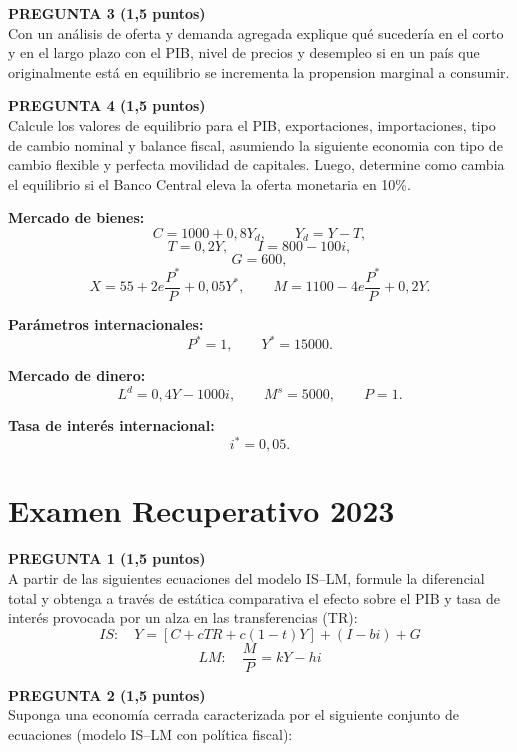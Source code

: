 \documentclass[11pt,addpoints]{article}
\begin{document}
\textbf{PREGUNTA 3 (1,5 puntos)}\\[0.2cm]
Con un análisis de oferta y demanda agregada explique qué sucedería en el corto y en el largo plazo con el PIB, nivel de precios y desempleo si en un país que originalmente está en equilibrio se incrementa la propension marginal a consumir. 
\vspace{0.4cm}

\textbf{PREGUNTA 4 (1,5 puntos)}\\[0.2cm]
Calcule los valores de equilibrio para el PIB, exportaciones, importaciones, tipo de cambio nominal y balance fiscal, asumiendo la siguiente economia con tipo de cambio flexible y perfecta movilidad de capitales. Luego, determine como cambia el equilibrio si el Banco Central eleva la oferta monetaria en 10\%.

\medskip
\textbf{Mercado de bienes:}
\[
C = 1000 + 0{,}8Y_d, \qquad Y_d = Y - T,
\]
\[
T = 0{,}2Y, \qquad I = 800 - 100i,
\]
\[
G = 600,
\]
\[
X = 55 + 2e\frac{P^*}{P} + 0{,}05Y^*, \qquad
M = 1100 - 4e\frac{P^*}{P} + 0{,}2Y.
\]

\textbf{Parámetros internacionales:}
\[
P^* = 1, \qquad Y^* = 15000.
\]

\textbf{Mercado de dinero:}
\[
L^d = 0{,}4Y - 1000i, \qquad M^s = 5000, \qquad P = 1.
\]

\textbf{Tasa de interés internacional:}
\[
i^* = 0{,}05.
\]


\newpage
\vspace*{0.1cm}
\section*{Examen Recuperativo 2023}

\vspace{0.4cm}

\textbf{PREGUNTA 1 (1,5 puntos)}\\[0.2cm]
A partir de las siguientes ecuaciones del modelo IS--LM, formule la diferencial total y obtenga a través de estática comparativa el efecto sobre el PIB y tasa de interés provocada por un alza en las transferencias (TR):
\[
IS: \quad Y = [C + cTR + c(1 - t)Y] + (I - bi) + G
\]
\[
LM: \quad \frac{M}{P} = kY - hi
\]


\vspace{0.4cm}

\textbf{PREGUNTA 2 (1,5 puntos)}\\[0.2cm]
Suponga una economía cerrada caracterizada por el siguiente conjunto de ecuaciones (modelo IS–LM con política fiscal):
\end{document}
